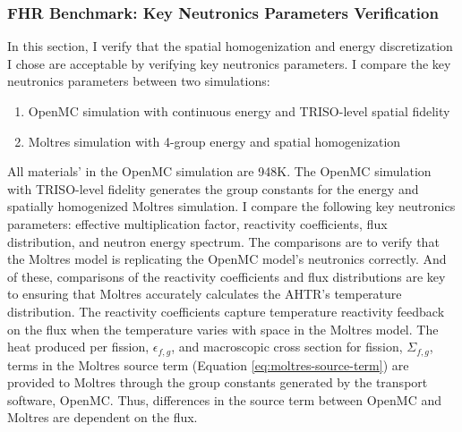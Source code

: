 \subsubsection{FHR Benchmark: Key Neutronics Parameters Verification}
In this section, I verify that the spatial homogenization and energy discretization 
I chose are acceptable by verifying key neutronics parameters.
I compare the key neutronics parameters between two simulations:
\begin{enumerate}
    \item OpenMC simulation with continuous energy and TRISO-level spatial fidelity 
    \item Moltres simulation with 4-group energy and spatial homogenization
\end{enumerate}
All materials' in the OpenMC simulation are 948K. 
The OpenMC simulation with TRISO-level fidelity generates the group constants for the 
energy and spatially homogenized Moltres simulation. 
I compare the following key neutronics parameters: effective multiplication factor, 
reactivity coefficients, flux distribution, and neutron energy spectrum. 
The comparisons are to verify that the Moltres model is replicating the OpenMC 
model's neutronics correctly.
And of these, comparisons of the reactivity coefficients and flux distributions 
are key to ensuring that Moltres accurately calculates the \gls{AHTR}'s 
temperature distribution.
The reactivity coefficients capture temperature reactivity feedback on the flux 
when the temperature varies with space in the Moltres model. 
The heat produced per fission, $\epsilon_{f,g}$, and macroscopic cross section 
for fission, $\Sigma_{f,g}$, terms in the Moltres source term (Equation 
\ref{eq:moltres-source-term}) are provided to Moltres through 
the group constants generated by the transport software, OpenMC.
Thus, differences in the source term between OpenMC and Moltres are dependent on 
the flux. 


